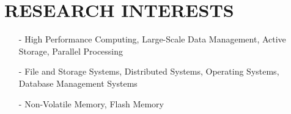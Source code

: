 \section{RESEARCH INTERESTS}
\begin{itemize}[leftmargin=*]
\setlength\itemsep{-0.02in}
\item[-] High Performance Computing, Large-Scale Data Management,
Active Storage, Parallel Processing
\item[-] File and Storage Systems, Distributed Systems, Operating Systems,
Database Management Systems
\item[-] Non-Volatile Memory, Flash Memory
\end{itemize}


